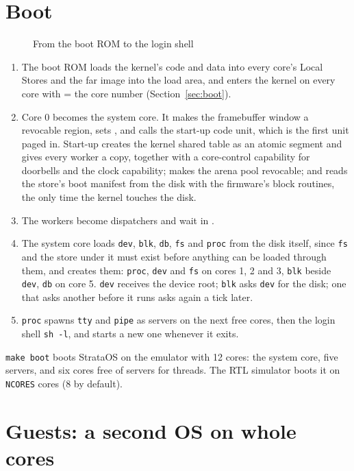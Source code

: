 \section{Boot}\label{sec:os-boot}

\begin{figure}[htbp]
\centering

\caption{From the boot ROM to the login shell}\label{fig:os-boot}
\end{figure}


\begin{enumerate}
\item The boot ROM loads the kernel's code and data into every core's Local Stores and the far image
  into the load area, and enters the kernel on every core with  = the core number
  (Section~\ref{sec:boot}).
\item Core 0 becomes the system core. It makes the framebuffer window a revocable region, sets
  , and calls the start-up code unit, which is the first unit paged in. Start-up creates the
  kernel shared table as an atomic segment and gives every worker a copy, together with a core-control
  capability for doorbells and the clock capability; makes the arena pool revocable; and reads the store's boot manifest from the
  disk with the firmware's block routines, the only time the kernel touches the disk.
\item The workers become dispatchers and wait in .
\item The system core loads \texttt{dev}, \texttt{blk}, \texttt{db}, \texttt{fs} and \texttt{proc}
  from the disk itself, since \texttt{fs} and the store under it must exist before anything can be
  loaded through them, and creates them: \texttt{proc}, \texttt{dev} and \texttt{fs} on cores 1, 2
  and 3, \texttt{blk} beside \texttt{dev}, \texttt{db} on core 5. \texttt{dev} receives the device
  root; \texttt{blk} asks \texttt{dev} for the disk; one that asks another before it runs asks again
  a tick later.
\item \texttt{proc} spawns \texttt{tty} and \texttt{pipe} as servers on the next free cores, then the
  login shell \texttt{sh -l}, and starts a new one whenever it exits.
\end{enumerate}

\texttt{make boot} boots StrataOS on the emulator with 12 cores: the system core, five servers, and six
cores free of servers for threads. The RTL simulator boots it on \texttt{NCORES} cores (8 by default).

\section{Guests: a second OS on whole cores}\label{sec:os-guests}

